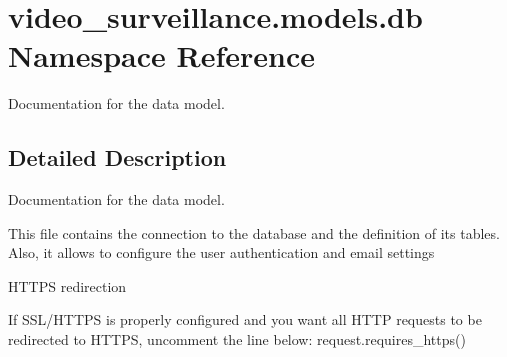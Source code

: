 \hypertarget{namespacevideo__surveillance_1_1models_1_1db}{}\section{video\+\_\+surveillance.\+models.\+db Namespace Reference}
\label{namespacevideo__surveillance_1_1models_1_1db}


Documentation for the data model.  




\subsection{Detailed Description}
Documentation for the data model. 

This file contains the connection to the database and the definition of its tables. Also, it allows to configure the user authentication and email settings

H\+T\+T\+PS redirection

If S\+S\+L/\+H\+T\+T\+PS is properly configured and you want all H\+T\+TP requests to be redirected to H\+T\+T\+PS, uncomment the line below\+: request.\+requires\+\_\+https() 